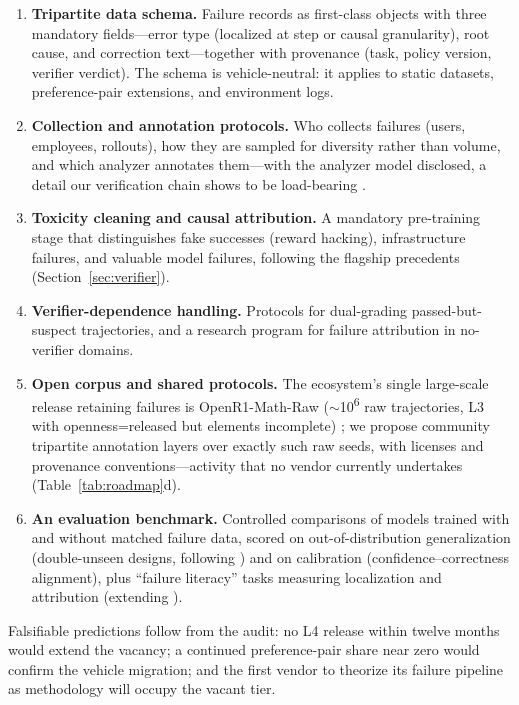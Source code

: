 \documentclass[10pt]{article}
\begin{document}
\begin{enumerate}
\item \textbf{Tripartite data schema.} Failure records as first-class objects with three mandatory fields---error type (localized at step or causal granularity), root cause, and correction text---together with provenance (task, policy version, verifier verdict). The schema is vehicle-neutral: it applies to static datasets, preference-pair extensions, and environment logs.
\item \textbf{Collection and annotation protocols.} Who collects failures (users, employees, rollouts), how they are sampled for diversity rather than volume, and which analyzer annotates them---with the analyzer model disclosed, a detail our verification chain shows to be load-bearing \cite{hao2026prs}.
\item \textbf{Toxicity cleaning and causal attribution.} A mandatory pre-training stage that distinguishes fake successes (reward hacking), infrastructure failures, and valuable model failures, following the flagship precedents (Section~\ref{sec:verifier}).
\item \textbf{Verifier-dependence handling.} Protocols for dual-grading passed-but-suspect trajectories, and a research program for failure attribution in no-verifier domains.
\item \textbf{Open corpus and shared protocols.} The ecosystem's single large-scale release retaining failures is OpenR1-Math-Raw ($\sim$10\textsuperscript{6} raw trajectories, L3 with openness=released but elements incomplete) \cite{openr12025mathraw}; we propose community tripartite annotation layers over exactly such raw seeds, with licenses and provenance conventions---activity that no vendor currently undertakes (Table~\ref{tab:roadmap}d).
\item \textbf{An evaluation benchmark.} Controlled comparisons of models trained with and without matched failure data, scored on out-of-distribution generalization (double-unseen designs, following \cite{hao2026prs}) and on calibration (confidence--correctness alignment), plus ``failure literacy'' tasks measuring localization and attribution (extending \cite{zheng2024processbench,song2025prmbench}).
\end{enumerate}

Falsifiable predictions follow from the audit: no L4 release within twelve months would extend the vacancy; a continued preference-pair share near zero would confirm the vehicle migration; and the first vendor to theorize its failure pipeline as methodology will occupy the vacant tier.
\end{document}
